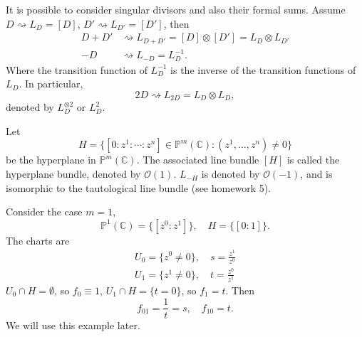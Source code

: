 \begin{remark}
  It is possible to consider singular divisors and also their formal sums.
  Assume \(D\rightsquigarrow L_D=[D]\), \(D'\rightsquigarrow L_{D'}=[D']\), then
  \begin{align*}
    D+D'&\rightsquigarrow L_{D+D'}=[D]\otimes [D']=L_D\otimes L_{D'} \\
    -D&\rightsquigarrow L_{-D}=L_D^{-1}
  .\end{align*}
  Where the transition function of \(L_D^{-1}\) is the inverse of the transition
  functions of \(L_D\). In particular, \[
    2D\rightsquigarrow L_{2D}=L_D\otimes L_D
  ,\] denoted by \(L_D^{\otimes 2}\) or \(L_D^2\).
\end{remark}
\begin{example}
  Let \[
    H=\{[0:z^1:\cdots :z^n]\in \mathbb{P}^m(\mathbb{C}):(z^1,\ldots,z^n)\neq 0\}
  \] be the hyperplane in \(\mathbb{P}^m(\mathbb{C})\). The associated line bundle
  \([H]\) is called the hyperplane bundle, denoted by \(\mathcal{O}(1)\).
  \(L_{-H}\) is denoted by \(\mathcal{O}(-1)\), and is isomorphic to the tautological
  line bundle (see homework 5).
\end{example}
\begin{example}
  Consider the case \(m=1\), \[
    \mathbb{P}^1(\mathbb{C})=\{[z^0:z^1]\},\quad H=\{[0:1]\}
  .\] The charts are
  \begin{gather*}
    U_0=\{z^0\neq 0\},\quad s=\frac{z^1}{z^0} \\
    U_1=\{z^1\neq 0\},\quad t=\frac{z^0}{z^1}
  \end{gather*}
  \(U_0\cap H=\emptyset\), so \(f_0\equiv 1\), \(U_1\cap H=\{t=0\}\), so \(f_1=t\).
  Then \[
    f_{01}=\frac{1}{t}=s,\quad f_{10}=t.
  \] We will use this example later.
\end{example}
